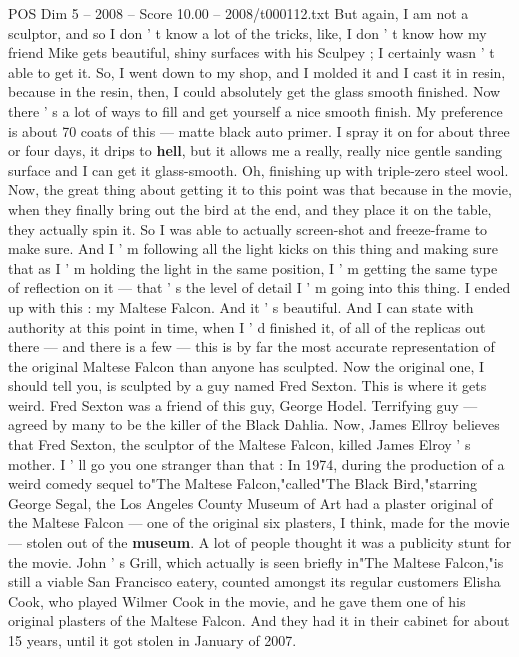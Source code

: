 \begin{textsample}{POS Dim 5 – 2008 – Score 10.00 – 2008/t000112.txt}
But again, I am not a sculptor, and so I don ' t know a lot of the tricks, like, I don ' t know how my friend Mike gets beautiful, shiny surfaces with his Sculpey ; I certainly wasn ' t able to get it.
So, I went down to my shop, and I molded it and I cast it in resin, because in the resin, then, I could absolutely get the glass smooth finished.
Now there ' s a lot of ways to fill and get yourself a nice smooth finish.
My preference is about 70 coats of this — matte black auto primer.
I spray it on for about three or four days, it drips to \textbf{hell}, but it allows me a really, really nice gentle sanding surface and I can get it glass-smooth.
Oh, finishing up with triple-zero steel wool.
Now, the great thing about getting it to this point was that because in the movie, when they finally bring out the bird at the end, and they place it on the table, they actually spin it.
So I was able to actually screen-shot and freeze-frame to make sure.
And I ' m following all the light kicks on this thing and making sure that as I ' m holding the light in the same position, I ' m getting the same type of reflection on it — that ' s the level of detail I ' m going into this thing.
I ended up with this : my Maltese Falcon.
And it ' s beautiful.
And I can state with authority at this point in time, when I ' d finished it, of all of the replicas out there — and there is a few — this is by far the most accurate representation of the original Maltese Falcon than anyone has sculpted.
Now the original one, I should tell you, is sculpted by a guy named Fred Sexton.
This is where it gets weird.
Fred Sexton was a friend of this guy, George Hodel.
Terrifying guy — agreed by many to be the killer of the Black Dahlia.
Now, James Ellroy believes that Fred Sexton, the sculptor of the Maltese Falcon, killed James Elroy ' s mother.
I ' ll go you one stranger than that : In 1974, during the production of a weird comedy sequel to"The Maltese Falcon,"called"The Black Bird,"starring George Segal, the Los Angeles County Museum of Art had a plaster original of the Maltese Falcon — one of the original six plasters, I think, made for the movie — stolen out of the \textbf{museum}.
A lot of people thought it was a publicity stunt for the movie.
John ' s Grill, which actually is seen briefly in"The Maltese Falcon,"is still a viable San Francisco eatery, counted amongst its regular customers Elisha Cook, who played Wilmer Cook in the movie, and he gave them one of his original plasters of the Maltese Falcon.
And they had it in their cabinet for about 15 years, until it got stolen in January of 2007.

\end{textsample}
